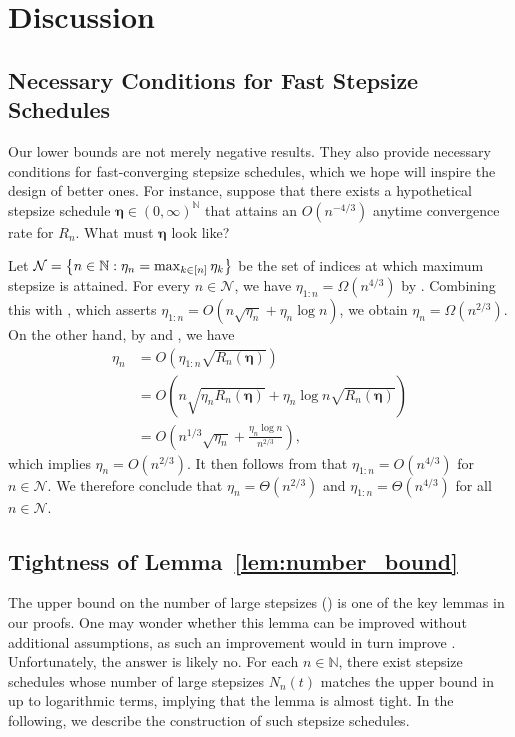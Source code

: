\documentclass[11pt]{article}
\newcommand{\N}{\mathbb{N}}
\newcommand{\schedule}{\bm{\eta}}
\begin{document}
\section{Discussion}


\subsection{Necessary Conditions for Fast Stepsize Schedules}

Our lower bounds are not merely negative results.
They also provide necessary conditions for fast-converging stepsize schedules, which we hope will inspire the design of better ones.
For instance, suppose that there exists a hypothetical stepsize schedule $\schedule\in(0,\infty)^{\N}$ that attains an $O(n^{-4/3})$ anytime convergence rate for $R_n$.
What must $\schedule$ look like?


Let $\mathcal{N} = \smash{\left\{ n\in\N: \eta_n = \max_{k\in[n]}\eta_k \right\}}$ be the set of indices at which maximum stepsize is attained.
For every $n\in\mathcal{N}$, we have $\eta_{1:n}=\Omega(n^{4/3})$ by .
Combining this with , which asserts $\eta_{1:n} = O(n\sqrt{\eta_n} + \eta_n\log n)$, we obtain $\eta_n=\Omega(n^{2/3})$.
On the other hand, by  and , we have
\begin{align*}
    \eta_n
    &= O\left(\eta_{1:n}\sqrt{R_n(\schedule)} \right) \\
    &= O\left(n\sqrt{\eta_n R_n(\schedule)} + \eta_n\log n \sqrt{R_n(\schedule)}\right) \\
    &= O\left(n^{1/3}\sqrt{\eta_n} + \frac{\eta_n\log n}{n^{2/3}}\right),
\end{align*}
which implies $\eta_n = O(n^{2/3})$.
It then follows from  that $\eta_{1:n} = O(n^{4/3})$ for $n\in\mathcal{N}$.
We therefore conclude that $\eta_n = \Theta(n^{2/3})$ and $\eta_{1:n} = \Theta(n^{4/3})$ for all $n\in\mathcal{N}$.


\subsection{Tightness of Lemma~\ref{lem:number_bound}}\label{sec:tightness_of_number_bound}

The upper bound on the number of large stepsizes () is one of the key lemmas in our proofs.
One may wonder whether this lemma can be improved without additional assumptions, as such an improvement would in turn improve .
Unfortunately, the answer is likely no.
For each $n\in\N$, there exist stepsize schedules whose number of large stepsizes $N_n(t)$ matches the upper bound in  up to logarithmic terms, implying that the lemma is almost tight.
In the following, we describe the construction of such stepsize schedules.
\end{document}
